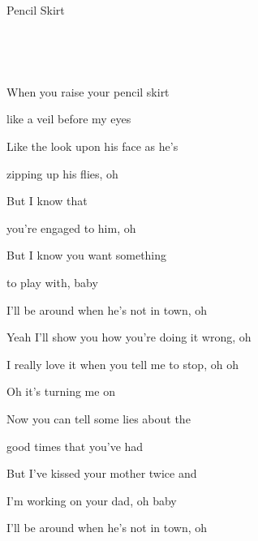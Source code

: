 \begin{song}{Pencil Skirt}{
	

	\mbox{ \CMaj \AMaj \DMaj \GMaj }


	\mbox{ \EmShAm \CMajShE \DMajShA \GMajShE}
	
}

\begin{SongVerse}

 When you raise your pencil skirt 


 like a veil before my eyes

 
 Like the look upon his face as he's

 
 zipping up his flies, oh


 But I know that


 you're engaged to him, oh


\hspace{10pt}But I  know you want something 


to play with, baby

\end{SongVerse}

\begin{SongVerse}

 I'll be around when he's not in town, oh 


 Yeah I'll show you how you're doing it wrong, oh 


 I really love it when you tell me to stop, oh oh 
                
 
 Oh it's turning me on

\end{SongVerse}

\begin{SongVerse}

 Now you can tell some lies about the


good times that you've had


But I've kissed your mother twice and


I'm working on your dad, oh baby


\end{SongVerse}

\begin{SongVerse}

 I'll be around when he's not in town, oh 



\end{SongVerse}
\end{song}
